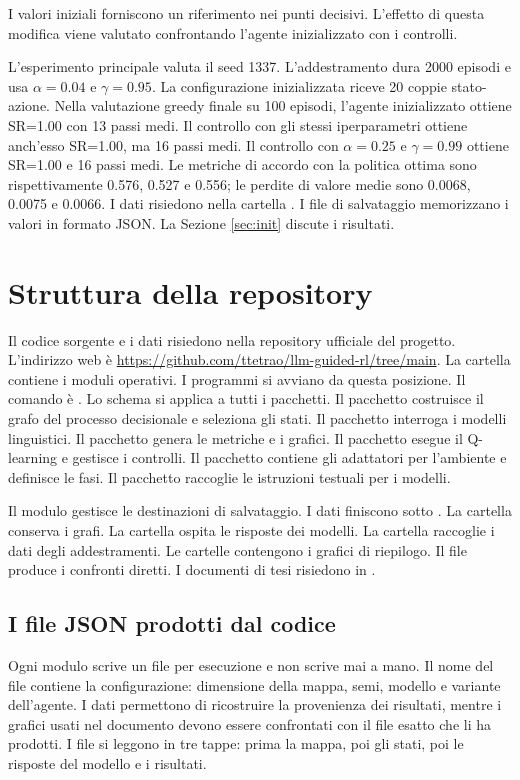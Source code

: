\documentclass[12pt,a4paper]{article}
\begin{document}
I valori iniziali forniscono un riferimento nei punti decisivi. L'effetto di questa modifica viene valutato confrontando l'agente inizializzato con i controlli.

L'esperimento principale valuta il seed 1337. L'addestramento dura 2000 episodi e usa $\alpha=0.04$ e $\gamma=0.95$. La configurazione inizializzata riceve 20 coppie stato-azione. Nella valutazione greedy finale su 100 episodi, l'agente inizializzato ottiene SR=1.00 con 13 passi medi. Il controllo con gli stessi iperparametri ottiene anch'esso SR=1.00, ma 16 passi medi. Il controllo con $\alpha=0.25$ e $\gamma=0.99$ ottiene SR=1.00 e 16 passi medi. Le metriche di accordo con la politica ottima sono rispettivamente 0.576, 0.527 e 0.556; le perdite di valore medie sono 0.0068, 0.0075 e 0.0066. I dati risiedono nella cartella .
I file di salvataggio memorizzano i valori in formato JSON.
La Sezione \ref{sec:init} discute i risultati.

\section{Struttura della repository}\label{sec:repo}
Il codice sorgente e i dati risiedono nella repository ufficiale del progetto. L'indirizzo web \`e \url{https://github.com/ttetrao/llm-guided-rl/tree/main}. La cartella  contiene i moduli operativi. I programmi si avviano da questa posizione. Il comando \`e . Lo schema si applica a tutti i pacchetti. 
Il pacchetto  costruisce il grafo del processo decisionale e seleziona gli stati.
Il pacchetto  interroga i modelli linguistici.
Il pacchetto  genera le metriche e i grafici.
Il pacchetto  esegue il Q-learning e gestisce i controlli.
Il pacchetto  contiene gli adattatori per l'ambiente e definisce le fasi.
Il pacchetto  raccoglie le istruzioni testuali per i modelli.

Il modulo  gestisce le destinazioni di salvataggio. I dati finiscono sotto . La cartella  conserva i grafi. La cartella  ospita le risposte dei modelli. La cartella  raccoglie i dati degli addestramenti. Le cartelle  contengono i grafici di riepilogo. Il file  produce i confronti diretti. I documenti di tesi risiedono in .

\subsection{I file JSON prodotti dal codice}\label{subsec:filejson}
Ogni modulo scrive un file per esecuzione e non scrive mai a mano. Il nome del file contiene la configurazione: dimensione della mappa, semi, modello e variante dell'agente. I dati permettono di ricostruire la provenienza dei risultati, mentre i grafici usati nel documento devono essere confrontati con il file esatto che li ha prodotti. I file si leggono in tre tappe: prima la mappa, poi gli stati, poi le risposte del modello e i risultati.
\end{document}
